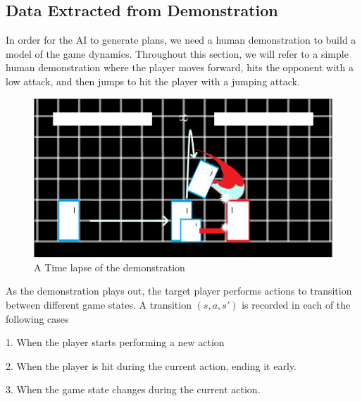 
\subsection{Data Extracted from Demonstration}

In order for the AI to generate plans, we need a human demonstration to build a model of the game dynamics. Throughout this section, we will refer to a simple human demonstration where the player moves forward, hits the opponent with a low attack, and then jumps to hit the player with a jumping attack.

\begin{figure}[h]
	\centering
	\includegraphics[scale=0.5]{Figures/Demonstration.png}
	\caption{A Time lapse of the demonstration}
	\label{ActionEffects}
\end{figure}

As the demonstration plays out, the target player performs actions to transition between different game states. A transition $(s,a,s')$ is recorded in each of the following cases

1. When the player starts performing a new action

2. When the player is hit during the current action, ending it early. 

3. When the game state changes during the current action.

